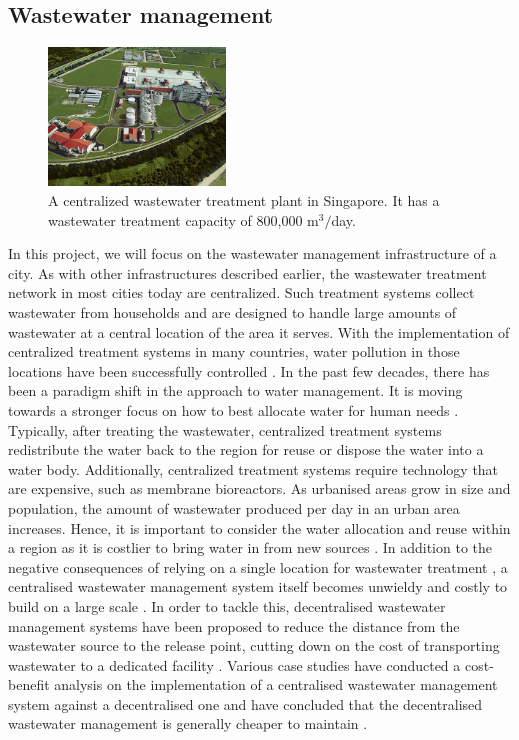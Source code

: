 \documentclass[preprint,12pt,authoryear]{elsarticle}
\begin{document}
\subsection{Wastewater management}
\begin{figure}
	\begin{center}
		\includegraphics[width=0.42\textwidth]{changiwrp.jpg}
	\end{center}
	\caption[A centralized wastewater treatment plant in Singapore.]{A centralized wastewater treatment plant in Singapore. It has a wastewater treatment capacity of 800,000 m$^3/$day. \citep{changiwrp}} 
\end{figure}
In this project, we will focus on the wastewater management infrastructure of a city. As with other infrastructures described earlier, the wastewater treatment network in most cities today are centralized. Such treatment systems collect wastewater from households and are designed to handle large amounts of wastewater at a central location of the area it serves. With the implementation of centralized treatment systems in many countries, water pollution in those locations have been successfully controlled \citep{li2014}. In the past few decades, there has been a paradigm shift in the approach to water management. It is moving towards a stronger focus on how to best allocate water for human needs \citep{gleick2000}. Typically, after treating the wastewater, centralized treatment systems redistribute the water back to the region for reuse or dispose the water into a water body. Additionally, centralized treatment systems require technology that are expensive, such as membrane bioreactors. As urbanised areas grow in size and population, the amount of wastewater produced per day in an urban area increases. Hence, it is important to consider the water allocation and reuse within a region as it is costlier to bring water in from new sources \citep{gleick2000}. In addition to the negative consequences of relying on a single location for wastewater treatment \citep{wilderer2000,bakir2001}, a centralised wastewater management system itself becomes unwieldy and costly to build on a large scale \citep{wilderer2000}. In order to tackle this, decentralised wastewater management systems have been proposed to reduce the distance from the wastewater source to the release point, cutting down on the cost of transporting wastewater to a dedicated facility \citep{otterpohl1997,wilderer2000,bakir2001}. Various case studies have conducted a cost-benefit analysis on the implementation of a centralised wastewater management system against a decentralised one and have concluded that the decentralised wastewater management is generally cheaper to maintain \citep{prihandrijanti2008,mawss2015}. 
\end{document}
